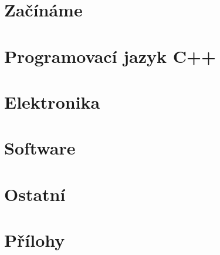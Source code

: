 \documentclass[12pt]{report} %
\begin{document}


\tableofcontents %

\chapter{Začínáme}
	
	

\chapter{Programovací jazyk C++}
	
	
	

\chapter{Elektronika}
	
	
	
	
	
	
	
\chapter{Software}
	
	
 
\chapter{Ostatní}
	
	


\chapter*{Přílohy}  
	
	
  \printindex %

\end{document}
